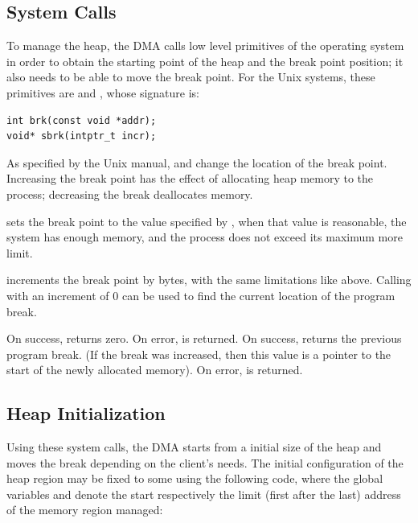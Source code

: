 \subsection{System Calls}

To manage the heap, the DMA calls low level primitives of the operating system in order to obtain the starting point of the heap and the break point position; it also needs to be able to move the break point.
For the Unix systems, these primitives are  and , whose signature is:
\begin{lstlisting}[style=cstyle]
int brk(const void *addr);
void* sbrk(intptr_t incr);
\end{lstlisting}

As specified by the Unix manual,  and  change the location of the break point. Increasing the break point has the effect of allocating heap memory to the process; decreasing the break deallocates memory.

 sets the break point to the value specified by , when that value is reasonable, the system has enough memory, and the process does not exceed its maximum more limit.

 increments the break point by  bytes, with the same limitations like above. Calling  with an increment of 0 can be used to find the current location of the program break.

On success,  returns zero. On error,  is returned. %
%
On success,  returns the previous program break. (If the break was increased, then this value is a pointer to the start of the newly allocated memory). On error,  is returned. %


\subsection{Heap Initialization}

Using these system calls, the DMA starts from a initial size of the heap and moves the break depending on the client's needs. The initial configuration of the heap region may be fixed to some  using the following code,
where the global variables  and  denote the start respectively the limit (first after the last) address of the memory region managed:

